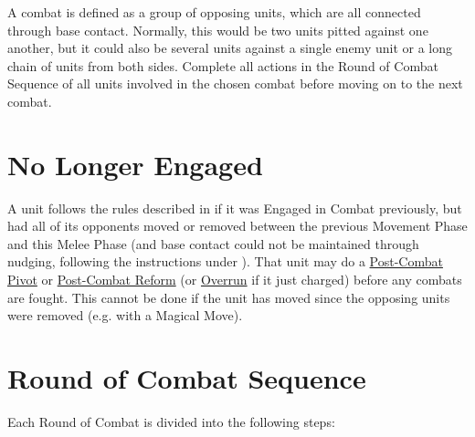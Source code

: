 A combat is defined as a group of opposing units, which are all connected through base contact. Normally, this would be two units pitted against one another, but it could also be several units against a single enemy unit or a long chain of units from both sides. Complete all actions in the Round of Combat Sequence of all units involved in the chosen combat before moving on to the next combat.

\section{No Longer Engaged}
\label{no_longer_engaged}

A unit follows the rules described in  if it was Engaged in Combat previously, but had all of its opponents moved or removed between the previous Movement Phase and this Melee Phase (and base contact could not be maintained through nudging, following the instructions under ). That unit may do a \hyperref[post_combat_pivot]{Post-Combat Pivot} or \hyperref[post_combat_reform]{Post-Combat Reform} (or \hyperref[overrun]{Overrun} if it just charged) before any combats are fought. This cannot be done if the unit has moved since the opposing units were removed (e.g. with a Magical Move).

\newpage
\section{Round of Combat Sequence}
\label{round_of_combat_sequence}

Each Round of Combat is divided into the following steps:

